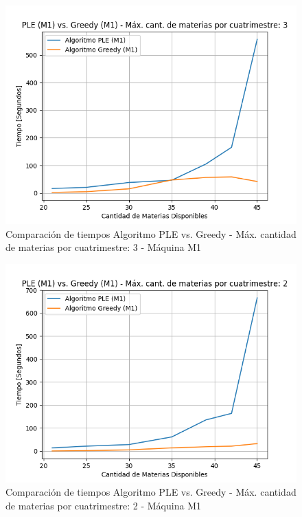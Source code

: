 \documentclass[a4paper]{article}
\begin{document}
\begin{figure}[H]
\centering
\includegraphics[scale=0.65]{Imagenes/m1_PLE_vs_GREEDY_max_mat_3.png}\par
\caption{Comparación de tiempos Algoritmo PLE vs. Greedy - Máx. cantidad de materias por cuatrimestre: 3 - Máquina M1}
\end{figure}

\begin{figure}[H]
\centering
\includegraphics[scale=0.65]{Imagenes/m1_PLE_vs_GREEDY_max_mat_2.png}\par
\caption{Comparación de tiempos Algoritmo PLE vs. Greedy - Máx. cantidad de materias por cuatrimestre: 2 - Máquina M1}
\end{figure}
\end{document}
